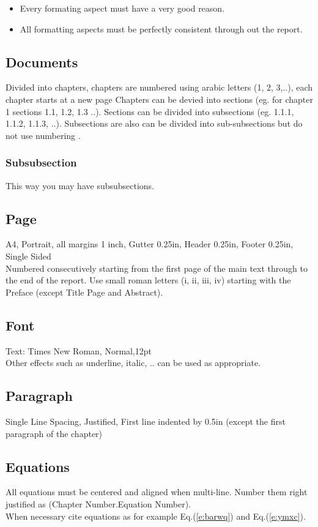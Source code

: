 \begin{itemize}
 \item Every formating aspect must have a very good reason.
 \item All formatting aspects must be perfectly consistent through out the report. 
\end{itemize}


\subsection{Documents}
Divided into chapters, chapters are numbered using arabic letters (1, 2, 3,..), each chapter starts at a new page
Chapters can be devied into sections (eg. for chapter 1 sections 1.1, 1.2, 1.3 ..). Sections can be divided into subsections (eg. 1.1.1, 1.1.2, 1.1.3, ..). Subsections are also can be divided into sub-subsections but do not use numbering \cite{batteryuniversity}.

\subsubsection{Subsubsection}
This way you may have subsubsections.

\subsection{Page}
A4, Portrait, all margins 1 inch, Gutter 0.25in, Header 0.25in, Footer 0.25in, Single Sided\\
Numbered consecutively starting from the first page of the main text through to the end of the report. Use small roman letters (i, ii, iii, iv) starting with the Preface (except Title Page and Abstract).
 
\subsection{Font}
Text: Times New Roman, Normal,12pt\\
Other effects such as underline, italic, .. can be used as appropriate.

\subsection{Paragraph}
Single Line Spacing, Justified, First line indented by 0.5in (except the first paragraph of the chapter)

\subsection{Equations}
All equations must be centered and aligned when multi-line. Number them right justified as (Chapter Number.Equation Number). \\
When necessary cite equations as for example Eq.(\ref{e:barwq}) and Eq.(\ref{e:ymxc}).

